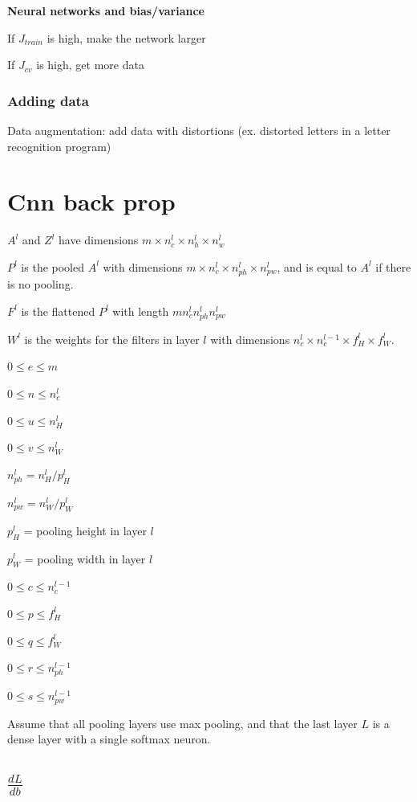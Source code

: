 \documentclass[12pt]{article}
\begin{document}
\textbf{Neural networks and bias/variance}

If $J_{train}$ is high, make the network larger

If $J_{cv}$ is high, get more data

\subsubsection{Adding data}

Data augmentation: add data with distortions (ex. distorted letters in a letter recognition program)

\section{Cnn back prop}

$A^l$ and $Z^l$ have dimensions $m \times n_c^l \times n_h^l \times n_w^l$

$P^l$ is the pooled $A^l$ with dimensions $m \times n_c^l \times n^l_{ph} \times n^l_{pw}$,
and is equal to $A^l$ if there is no pooling.

$F^l$ is the flattened $P^l$ with length $m n_c^l n_{ph}^l n_{pw}^l$

$W^l$ is the weights for the filters in layer $l$ with dimensions $n_c^l \times n_c^{l-1}
\times f_H^l \times f_W^l$.

$0 \le e \le m$

$0 \le n \le n_c^l$

$0 \le u \le n_H^l$

$0 \le v \le n_W^l$

$n_{ph}^l = n_H^l/p^l_H$

$n_{pw}^l = n_W^l/p^l_W$

$p^l_H$ = pooling height in layer $l$

$p^l_W$ = pooling width in layer $l$

$0 \le c \le n_c^{l-1}$

$0 \le p \le f_H^l$

$0 \le q \le f_W^l$

$0 \le r \le n^{l-1}_{ph}$

$0 \le s \le n^{l-1}_{pw}$

Assume that all pooling layers use max pooling, and that the last layer $L$ is a dense layer with
a single softmax neuron.

\subsection{$\frac{dL}{db}$}
\end{document}
